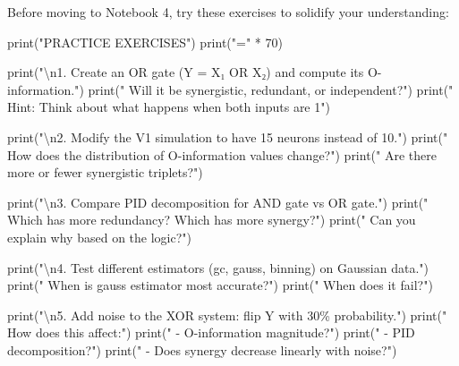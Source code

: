 \documentclass[
  11pt,
  letterpaper,
  oneside,
  openany]{book}
\newenvironment{Shaded}{\begin{snugshade}}{\end{snugshade}}
\newcommand{\BuiltInTok}[1]{\textcolor[rgb]{0.00,0.23,0.31}{#1}}
\newcommand{\CharTok}[1]{\textcolor[rgb]{0.13,0.47,0.30}{#1}}
\newcommand{\DecValTok}[1]{\textcolor[rgb]{0.68,0.00,0.00}{#1}}
\newcommand{\NormalTok}[1]{\textcolor[rgb]{0.00,0.23,0.31}{#1}}
\newcommand{\OperatorTok}[1]{\textcolor[rgb]{0.37,0.37,0.37}{#1}}
\newcommand{\StringTok}[1]{\textcolor[rgb]{0.13,0.47,0.30}{#1}}
\begin{document}
Before moving to Notebook 4, try these exercises to solidify your
understanding:

\begin{Shaded}
\begin{Highlighting}[]
\BuiltInTok{print}\NormalTok{(}\StringTok{"PRACTICE EXERCISES"}\NormalTok{)}
\BuiltInTok{print}\NormalTok{(}\StringTok{"="} \OperatorTok{*} \DecValTok{70}\NormalTok{)}

\BuiltInTok{print}\NormalTok{(}\StringTok{"}\CharTok{\textbackslash{}n}\StringTok{1. Create an OR gate (Y = X₁ OR X₂) and compute its O{-}information."}\NormalTok{)}
\BuiltInTok{print}\NormalTok{(}\StringTok{"   Will it be synergistic, redundant, or independent?"}\NormalTok{)}
\BuiltInTok{print}\NormalTok{(}\StringTok{"   Hint: Think about what happens when both inputs are 1"}\NormalTok{)}

\BuiltInTok{print}\NormalTok{(}\StringTok{"}\CharTok{\textbackslash{}n}\StringTok{2. Modify the V1 simulation to have 15 neurons instead of 10."}\NormalTok{)}
\BuiltInTok{print}\NormalTok{(}\StringTok{"   How does the distribution of O{-}information values change?"}\NormalTok{)}
\BuiltInTok{print}\NormalTok{(}\StringTok{"   Are there more or fewer synergistic triplets?"}\NormalTok{)}

\BuiltInTok{print}\NormalTok{(}\StringTok{"}\CharTok{\textbackslash{}n}\StringTok{3. Compare PID decomposition for AND gate vs OR gate."}\NormalTok{)}
\BuiltInTok{print}\NormalTok{(}\StringTok{"   Which has more redundancy? Which has more synergy?"}\NormalTok{)}
\BuiltInTok{print}\NormalTok{(}\StringTok{"   Can you explain why based on the logic?"}\NormalTok{)}

\BuiltInTok{print}\NormalTok{(}\StringTok{"}\CharTok{\textbackslash{}n}\StringTok{4. Test different estimators (\textquotesingle{}gc\textquotesingle{}, \textquotesingle{}gauss\textquotesingle{}, \textquotesingle{}binning\textquotesingle{}) on Gaussian data."}\NormalTok{)}
\BuiltInTok{print}\NormalTok{(}\StringTok{"   When is \textquotesingle{}gauss\textquotesingle{} estimator most accurate?"}\NormalTok{)}
\BuiltInTok{print}\NormalTok{(}\StringTok{"   When does it fail?"}\NormalTok{)}

\BuiltInTok{print}\NormalTok{(}\StringTok{"}\CharTok{\textbackslash{}n}\StringTok{5. Add noise to the XOR system: flip Y with 30\% probability."}\NormalTok{)}
\BuiltInTok{print}\NormalTok{(}\StringTok{"   How does this affect:"}\NormalTok{)}
\BuiltInTok{print}\NormalTok{(}\StringTok{"   {-} O{-}information magnitude?"}\NormalTok{)}
\BuiltInTok{print}\NormalTok{(}\StringTok{"   {-} PID decomposition?"}\NormalTok{)}
\BuiltInTok{print}\NormalTok{(}\StringTok{"   {-} Does synergy decrease linearly with noise?"}\NormalTok{)}


\end{Highlighting}
\end{Shaded}
\end{document}
